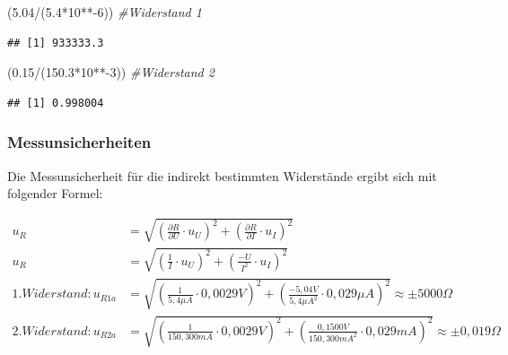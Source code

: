 \documentclass[
  9pt,
]{article}
\newenvironment{Shaded}{\begin{snugshade}}{\end{snugshade}}
\newcommand{\CommentTok}[1]{\textcolor[rgb]{0.56,0.35,0.01}{\textit{#1}}}
\newcommand{\DecValTok}[1]{\textcolor[rgb]{0.00,0.00,0.81}{#1}}
\newcommand{\FloatTok}[1]{\textcolor[rgb]{0.00,0.00,0.81}{#1}}
\newcommand{\NormalTok}[1]{#1}
\newcommand{\SpecialCharTok}[1]{\textcolor[rgb]{0.00,0.00,0.00}{#1}}
\begin{document}
\begin{Shaded}
\begin{Highlighting}[]
\NormalTok{(}\FloatTok{5.04}\SpecialCharTok{/}\NormalTok{(}\FloatTok{5.4}\SpecialCharTok{*}\DecValTok{10}\SpecialCharTok{**{-}}\DecValTok{6}\NormalTok{)) }\CommentTok{\#Widerstand 1}
\end{Highlighting}
\end{Shaded}

\begin{verbatim}
## [1] 933333.3
\end{verbatim}

\begin{Shaded}
\begin{Highlighting}[]
\NormalTok{(}\FloatTok{0.15}\SpecialCharTok{/}\NormalTok{(}\FloatTok{150.3}\SpecialCharTok{*}\DecValTok{10}\SpecialCharTok{**{-}}\DecValTok{3}\NormalTok{)) }\CommentTok{\#Widerstand 2}
\end{Highlighting}
\end{Shaded}

\begin{verbatim}
## [1] 0.998004
\end{verbatim}

\hypertarget{messunsicherheiten-1}{%
\subsubsection{Messunsicherheiten}\label{messunsicherheiten-1}}

Die Messunsicherheit für die indirekt bestimmten Widerstände ergibt sich
mit folgender Formel:

\begin {equation*}
\begin{split}
u_R &= \sqrt{\left (\frac{\partial R}{\partial U} \cdot u_U\right )^2 + \left (\frac{\partial R}{\partial I} \cdot u_I\right )^2 } \\
u_R &= \sqrt{\left (\frac{1}{I} \cdot u_U\right )^2 + \left (\frac{-U}{I^2} \cdot u_I\right )^2 } \\
1.Widerstand: u_{R1a}&= \sqrt{\left (\frac{1}{5,4\mu A} \cdot 0,0029V\right )^2 + \left (\frac{-5,04V}{5,4\mu A^2} \cdot 0,029 \mu A\right )^2 } \approx \pm 5000\Omega \\
2.Widerstand: u_{R2a}&= \sqrt{\left (\frac{1}{150,300mA} \cdot 0,0029V \right )^2 + \left (\frac{0,1500V}{150,300mA^2} \cdot 0,029mA\right )^2 } \approx \pm 0,019 \Omega
\end{split}
\end{equation*}
\end{document}
